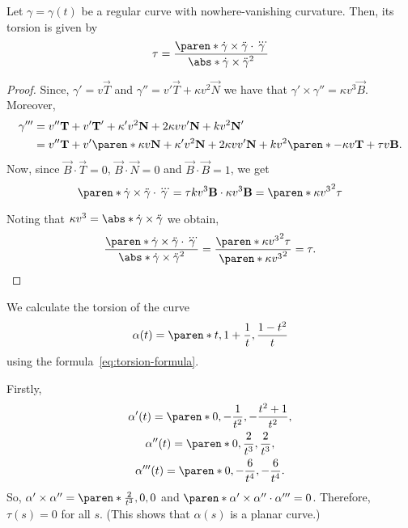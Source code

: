 \documentclass[11pt]{penrose}
\newcommand{\vT}{\vec{T}}
\newcommand{\vN}{\vec{N}}
\newcommand{\vB}{\vec{B}}
\begin{document}
\begin{nthm}
    Let $\gamma = \gamma(t)$ be a regular curve with nowhere-vanishing curvature. Then, its torsion is given by
    \begin{equation}
        \tau
        = \frac{\paren*{\dot{\gamma} \times \ddot{\gamma}} \cdot \dddot{\gamma}}{\abs*{\dot{\gamma} \times \ddot{\gamma}}^2}
        \label{eq:torsion-formula}
    \end{equation}
\end{nthm}
\begin{proof}
    Since, $\gamma' = v \vT$ and $\gamma'' = v' \vT + \kappa v^2 \vN$ we have that $\gamma' \times \gamma'' = \kappa v^3 \vB$. Moreover,
    \begin{align}
        \gamma'''
        &= v'' \vT + v' \vT' + \kappa' v^2 \vN + 2 \kappa v v' \vN + k v^2 \vN'\\
        &= v'' \vT + v' \paren*{\kappa v \vN} + \kappa' v^2 \vN + 2 \kappa v v' \vN + k v^2 \paren*{-\kappa v \vT + \tau v \vB}.
    \end{align}
    Now, since $\vB \cdot \vT = 0$, $\vB \cdot \vN = 0$ and $\vB \cdot \vB = 1$, we get
    \begin{equation}
        \paren*{\dot{\gamma} \times \ddot{\gamma}} \cdot \dddot{\gamma}
        = \tau k v^3 \vB \cdot \kappa v^3 \vB
        = \paren*{\kappa v^3}^2 \tau
    \end{equation}

    Noting that $\kappa v^3 = \abs*{\dot{\gamma} \times \ddot{\gamma}}$ we obtain,
    \begin{equation}
        \frac{\paren*{\dot{\gamma} \times \ddot{\gamma}} \cdot \dddot{\gamma}}{\abs*{\dot{\gamma} \times \ddot{\gamma}}^2}
        = \frac{\paren*{\kappa v^3}^2 \tau}{\paren*{\kappa v^3}^2}
        = \tau.\qedhere
    \end{equation}
\end{proof}

\begin{negg}
    We calculate the torsion of the curve
    \begin{equation}
        \alpha(t)
        = \paren*{ t, 1 + \frac{1}{t}, \frac{1 - t^2}{t} }
    \end{equation}
    using the formula~\eqref{eq:torsion-formula}.

    Firstly,
    \begin{gather}
        \alpha'(t) = \paren*{0, -\frac{1}{t^2}, -\frac{t^2 + 1}{t^2}},\\
        \alpha''(t) = \paren*{0, \frac{2}{t^3}, \frac{2}{t^3}},\\
        \alpha'''(t) = \paren*{0, -\frac{6}{t^4}, -\frac{6}{t^4}}.
    \end{gather}
    So, $\alpha' \times \alpha'' = \paren*{\frac{2}{t^3}, 0, 0}$ and $\paren*{\alpha' \times \alpha''} \cdot \alpha''' = 0$. Therefore, $\tau(s) = 0$ for all $s$. (This shows that $\alpha(s)$ is a planar curve.)
\end{negg}
\end{document}
